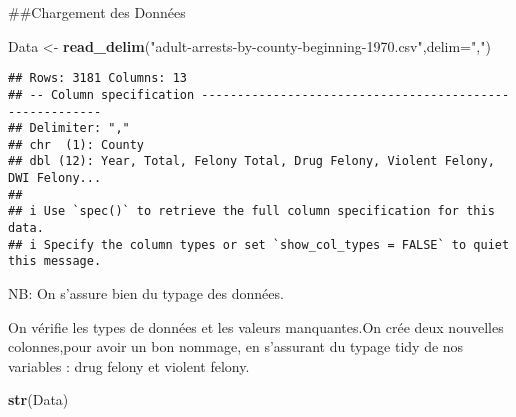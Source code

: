 \documentclass[
]{article}
\newenvironment{Shaded}{\begin{snugshade}}{\end{snugshade}}
\newcommand{\AttributeTok}[1]{\textcolor[rgb]{0.13,0.29,0.53}{#1}}
\newcommand{\FunctionTok}[1]{\textcolor[rgb]{0.13,0.29,0.53}{\textbf{#1}}}
\newcommand{\NormalTok}[1]{#1}
\newcommand{\OtherTok}[1]{\textcolor[rgb]{0.56,0.35,0.01}{#1}}
\newcommand{\StringTok}[1]{\textcolor[rgb]{0.31,0.60,0.02}{#1}}
\begin{document}
\#\#Chargement des Données

\begin{Shaded}
\begin{Highlighting}[]
\NormalTok{Data }\OtherTok{\textless{}{-}} \FunctionTok{read\_delim}\NormalTok{(}\StringTok{"adult{-}arrests{-}by{-}county{-}beginning{-}1970.csv"}\NormalTok{,}\AttributeTok{delim=}\StringTok{","}\NormalTok{)}
\end{Highlighting}
\end{Shaded}

\begin{verbatim}
## Rows: 3181 Columns: 13
## -- Column specification --------------------------------------------------------
## Delimiter: ","
## chr  (1): County
## dbl (12): Year, Total, Felony Total, Drug Felony, Violent Felony, DWI Felony...
## 
## i Use `spec()` to retrieve the full column specification for this data.
## i Specify the column types or set `show_col_types = FALSE` to quiet this message.
\end{verbatim}

NB: On s'assure bien du typage des données.

On vérifie les types de données et les valeurs manquantes.On crée deux
nouvelles colonnes,pour avoir un bon nommage, en s'assurant du typage
tidy de nos variables : drug felony et violent felony.

\begin{Shaded}
\begin{Highlighting}[]
\FunctionTok{str}\NormalTok{(Data)}
\end{Highlighting}
\end{Shaded}
\end{document}
